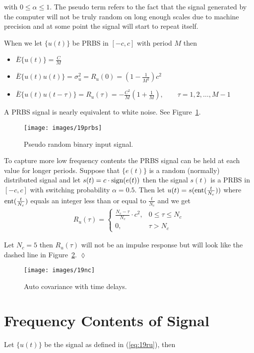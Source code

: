 with $0\leq\alpha\leq1$.
The pseudo term refers to the fact that the signal generated by the computer will not be truly random on long enough scales due to machine precision and at some point the signal will start to repeat itself.

When we let $\{u(t)\}$ be PRBS in $[-c,c]$ with period $M$ then
\begin{itemize}
\item $\bar{E}\{u(t)\} = \frac{C}{M}$
\item $\bar{E}\{u(t)u(t)\} = \sigma_u^2 = R_u(0) = (1-\frac{1}{M^2})c^2$
\item $\bar{E}\{u(t)u(t-\tau)\} = R_u(\tau) = -\frac{C^2}{M}(1+\frac{1}{M}), \qquad \tau=1,2,\ldots,M-1$
\end{itemize}
A PRBS signal is nearly equivalent to white noise.
See Figure~\ref{fig:19prbs}.

\begin{figure}[ht!]
\centering
\texttt{[image: images/19prbs]}
\caption{Pseudo random binary input signal.}%
\label{fig:19prbs}
\end{figure}

To capture more low frequency contents the PRBS signal can be held at each value for longer periods.
Suppose that $\{e(t)\}$ is a random (normally) distributed signal and let $s(t)=c\cdot\mathop{\text{sign}}\limits(e(t))$ then the signal $s(t)$ is a PRBS in $[-c,c]$ with switching probability $\alpha=0.5$.
Then let $u(t)=s(\mathop{\text{ent}}\limits(\frac{t}{N_c}))$ where $\mathop{\text{ent}}\limits(\frac{t}{N_c})$ equals an integer less than or equal to $\frac{t}{N_c}$ and we get
\begin{align}
\label{eq:19ru}
R_u(\tau) = \begin{cases} \frac{N_c-\tau}{N_c}\cdot c^2, & 0\leq\tau\leq N_c \\ 0, & \tau>N_c \end{cases}
\end{align}

\begin{example}
Let $N_c=5$ then $R_u(\tau)$ will not be an impulse response but will look like the dashed line in Figure~\ref{fig:19nc}.
$\lozenge$
\end{example}

\begin{figure}[ht!]
\centering
\texttt{[image: images/19nc]}
\caption{Auto covariance with time delays.}%
\label{fig:19nc}
\end{figure}

\section{Frequency Contents of Signal}
Let $\{u(t)\}$ be the signal as defined in (\ref{eq:19ru}), then

